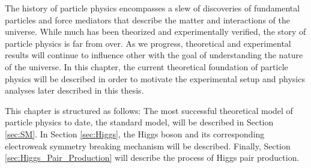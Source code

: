 The history of particle physics encompasses a slew of discoveries of fundamental particles and force mediators that describe the matter and interactions of the universe. While much has been theorized and experimentally verified, the story of particle physics is far from over. As we progress, theoretical and experimental results will continue to influence other with the goal of understanding the nature of the universe. In this chapter, the current theoretical foundation of particle physics will be described in order to motivate the experimental setup and physics analyses later described in this thesis.

This chapter is structured as follows: The most successful theoretical model of particle physics to date, the standard model, will be described in Section \ref{sec:SM}. In Section \ref{sec:Higgs}, the Higgs boson and its corresponding electroweak symmetry breaking mechanism will be described. Finally, Section \ref{sec:Higgs_Pair_Production} will describe the process of Higgs pair production.


